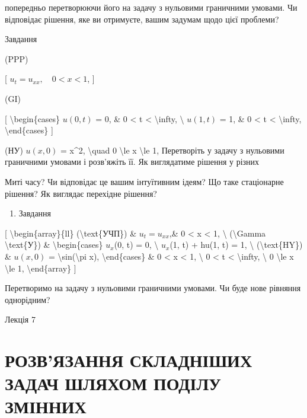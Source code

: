 \documentclass[
]{article}
\providecommand{\tightlist}{%
  \setlength{\itemsep}{0pt}\setlength{\parskip}{0pt}}
\begin{document}
{{попередньо перетворюючи його на задачу з нульовими граничними умовами.
Чи відповідає рішення, яке ви отримуєте, вашим задумам щодо цієї
проблеми?

Завдання

(PPP)

{[} \(u_t = u_{xx}, \quad 0 < x < 1\), {]}

(GI)

{[} \textbackslash begin\{cases\} \(u(0, t)\) = 0, \& 0 \textless{} t
\textless{} \textbackslash infty, \textbackslash{} \(u(1, t)\) = 1, \& 0
\textless{} t \textless{} \textbackslash infty,
\textbackslash end\{cases\} {]}

(НУ) \(u(x, 0)\) = x\^{}2, \textbackslash quad 0 \textbackslash le x
\textbackslash le 1, Перетворіть у задачу з нульовими граничними умовами
і розв'яжіть її. Як виглядатиме рішення у різних

Миті часу? Чи відповідає це вашим інтуїтивним ідеям? Що таке стаціонарне
рішення? Як виглядає перехідне рішення?

\begin{enumerate}
\def\labelenumi{\arabic{enumi}.}
\setcounter{enumi}{2}
\tightlist
\item
  Завдання
\end{enumerate}

{[} \textbackslash begin\{array\}\{ll\} (\textbackslash text\{УЧП\}) \&
\(u_t = u_{xx}\),\& 0 \textless{} x \textless{} 1, \textbackslash{}
(\textbackslash Gamma \textbackslash text\{У\}) \&
\textbackslash begin\{cases\} \(u_x\)(0, t) = 0, \textbackslash{}
\(u_x\)(1, t) + hu(1, t) = 1, \textbackslash{}
(\textbackslash text\{HY\}) \& \(u(x, 0)\) =
\textbackslash sin(\textbackslash pi x), \textbackslash end\{cases\} \&
0 \textless{} x \textless{} 1, \textbackslash{} 0 \textless{} t
\textless{} \textbackslash infty, \textbackslash{} 0 \textbackslash le x
\textbackslash le 1, \textbackslash end\{array\} {]}

Перетворимо на задачу з нульовими граничними умовами. Чи буде нове
рівняння однорідним?

Лекція 7

\section{РОЗВ'ЯЗАННЯ СКЛАДНІШИХ ЗАДАЧ ШЛЯХОМ ПОДІЛУ
ЗМІННИХ}\label{ux440ux43eux437ux432ux44fux437ux430ux43dux43dux44f-ux441ux43aux43bux430ux434ux43dux456ux448ux438ux445-ux437ux430ux434ux430ux447-ux448ux43bux44fux445ux43eux43c-ux43fux43eux434ux456ux43bux443-ux437ux43cux456ux43dux43dux438ux445}

}}
\end{document}
